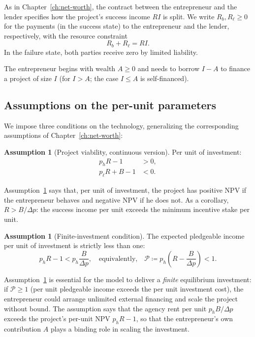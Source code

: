\documentclass[11pt,a4paper,oneside]{book}
\def\leq{\leqslant}
\def\geq{\geqslant}
\theoremstyle{plain}
\theoremstyle{definition}
\newtheorem{assumption}[theorem]{Assumption}
\theoremstyle{remark}
\numberwithin{equation}{chapter}
\begin{document}
As in Chapter~\ref{ch:net-worth}, the contract between the entrepreneur and the lender specifies how the project's success income $R I$ is split.
We write $R_b, R_\ell \geq 0$ for the payments (in the success state) to the entrepreneur and the lender, respectively, with the resource constraint
\begin{equation}\label{eq:EM-sharing}
  R_b + R_\ell = R I.
\end{equation}
In the failure state, both parties receive zero by limited liability.

The entrepreneur begins with wealth $A \geq 0$ and needs to borrow $I - A$ to finance a project of size $I$ (for $I > A$; the case $I \leq A$ is self-financed).

\subsection{Assumptions on the per-unit parameters}

We impose three conditions on the technology, generalizing the corresponding assumptions of Chapter~\ref{ch:net-worth}:

\begin{assumption}[Project viability, continuous version]\label{ass:EM-viability}
Per unit of investment:
\begin{align}
  p_h R - 1 &> 0, \tag{V.1'}\label{eq:EM-NPV-h} \\
  p_\ell R + B - 1 &< 0. \tag{V.2'}\label{eq:EM-NPV-l}
\end{align}
\end{assumption}

Assumption~\ref{ass:EM-viability} says that, per unit of investment, the project has positive NPV if the entrepreneur behaves and negative NPV if he does not.
As a corollary, $R > B/\Delta p$: the success income per unit exceeds the minimum incentive stake per unit.

\begin{assumption}[Finite-investment condition]\label{ass:EM-finite}
The expected pledgeable income per unit of investment is strictly less than one:
\begin{equation}\label{eq:EM-finite}
  p_h R - 1 < p_h \frac{B}{\Delta p},
  \quad \text{equivalently,} \quad
  \mathcal{P} \coloneqq p_h \left( R - \frac{B}{\Delta p} \right) < 1.
\end{equation}
\end{assumption}

Assumption~\ref{ass:EM-finite} is essential for the model to deliver a \emph{finite} equilibrium investment: if $\mathcal{P} \geq 1$ (per unit pledgeable income exceeds the per unit investment cost), the entrepreneur could arrange unlimited external financing and scale the project without bound.
The assumption says that the agency rent per unit $p_h B / \Delta p$ exceeds the project's per-unit NPV $p_h R - 1$, so that the entrepreneur's own contribution $A$ plays a binding role in scaling the investment.
\end{document}
